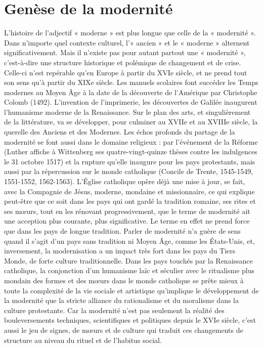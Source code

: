 \section{Genèse de la modernité}


 
L'histoire de l'adjectif « moderne » est plus longue que celle de la « modernité ». Dans n'importe quel contexte culturel, l'« ancien » et le « moderne » alternent significativement. Mais il n'existe pas pour autant partout une « modernité », c'est-à-dire une structure historique et polémique de changement et de crise. Celle-ci n'est repérable qu'en Europe à partir du XVIe siècle, et ne prend tout son sens qu'à partir du XIXe siècle.
Les manuels scolaires font succéder les Temps modernes au Moyen Âge à la date de la découverte de l'Amérique par Christophe Colomb (1492). L'invention de l'imprimerie, les découvertes de Galilée inaugurent l'humanisme moderne de la Renaissance. Sur le plan des arts, et singulièrement de la littérature, va se développer, pour culminer au XVIIe et au XVIIIe siècle, la querelle des Anciens et des Modernes. Les échos profonds du partage de la modernité se font aussi dans le domaine religieux : par l'événement de la Réforme (Luther affiche à Wittenberg ses quatre-vingt-quinze thèses contre les indulgences le 31 octobre 1517) et la rupture qu'elle inaugure pour les pays protestants, mais aussi par la répercussion sur le monde catholique (Concile de Trente, 1545-1549, 1551-1552, 1562-1563). L'Église catholique opère déjà une mise à jour, se fait, avec la Compagnie de Jésus, moderne, mondaine et missionnaire, ce qui explique peut-être que ce soit dans les pays qui ont gardé la tradition romaine, ses rites et ses mœurs, tout en les rénovant progressivement, que le terme de modernité ait une acception plus courante, plus significative. Le terme en effet ne prend force que dans les pays de longue tradition. Parler de modernité n'a guère de sens quand il s'agit d'un pays sans tradition ni Moyen Âge, comme les États-Unis, et, inversement, la modernisation a un impact très fort dans les pays du Tiers Monde, de forte culture traditionnelle.
Dans les pays touchés par la Renaissance catholique, la conjonction d'un humanisme laïc et séculier avec le ritualisme plus mondain des formes et des mœurs dans le monde catholique se prête mieux à toute la complexité de la vie sociale et artistique qu'implique le développement de la modernité que la stricte alliance du rationalisme et du moralisme dans la culture protestante. Car la modernité n'est pas seulement la réalité des bouleversements techniques, scientifiques et politiques depuis le XVIe siècle, c'est aussi le jeu de signes, de mœurs et de culture qui traduit ces changements de structure au niveau du rituel et de l'habitus social.
